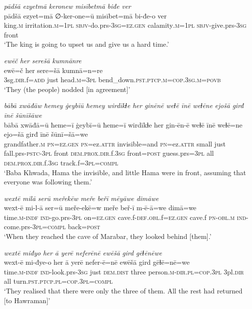 \ea \label{BP.102}
\textit{pādšā ezyetmā keronew misībetmā biđe ver} \\ 
\gll pādšā ezyet=mā ∅-ker-one=ū misībet=mā bi-đe-o ver \\ 
 king\textsc{.m} irritation\textsc{.m}\textsc{=\textsc{1pl}} \textsc{sbjv-}do.prs\textsc{-3sg}\textsc{=ez.gen} calamity\textsc{.m}\textsc{=\textsc{1pl}} \textsc{sbjv-}give.prs\textsc{-3sg} front \\ 
\glt `The king is going to upset us and give us a hard time.'
\z 
 
\ea \label{BP.104}
\textit{ewēč her serešā kumnānre} \\ 
\gll ewē=č her sere=šā kumnā=n=re \\ 
 3sg\textsc{.dir}.f\textsc{=add} just head\textsc{.m}\textsc{=3pl} bend\_down\textsc{.pst}\textsc{.ptcp}\textsc{.m}\textsc{=cop}\textsc{.3sg}\textsc{.m}\textsc{=\textsc{povb}} \\ 
\glt `They (the people) nodded [in agreement]'
\z 
 
\ea \label{BP.105}
\textit{bābā xwāđāw ħemey ġeybīū ħemey wirdīkɫe her ginēnē weɫē īnē weɫēne ejošā girđ īnē šūnīšāwe} \\ 
\gll bābā xwāđā=ū ħeme=ī ġeybī=ū ħeme=ī wirdīkɫe her gin-ēn-ē weɫē īnē weɫē=ne ejo=šā girđ īnē šūnī=šā=we \\ 
 grandfather\textsc{.m} \textsc{pn}\textsc{=ez.gen} \textsc{pn}=ez.\textsc{attr} invisible=and \textsc{pn}=ez.\textsc{attr} small just fall.prs\textsc{-pstc}\textsc{-3pl} front \textsc{dem.prox}\textsc{.dir}.f\textsc{.3sg} front\textsc{=\textsc{post}} guess.prs\textsc{=3pl} all \textsc{dem.prox}\textsc{.dir}.f\textsc{.3sg} track.f\textsc{=3pl}\textsc{=compl} \\ 
\glt `Baba Khwada, Hama the invisible, and little Hama were in front, assuming that everyone was following them.'
\z 
 
\ea \label{BP.106}
\textit{wextē milā serū meřekēw meře beřī mēyāwe dimāwe} \\ 
\gll wext-ē mi-l-ā ser=ū meře-ekē=w meře beř-ī m-ē-ā=we dimā=we \\ 
 time\textsc{.m}\textsc{-indf} \textsc{ind-}go.prs\textsc{-3pl} on\textsc{=ez.gen} cave.f\textsc{-def}\textsc{.obl}.f\textsc{=ez.gen} cave.f \textsc{pn}\textsc{-obl}\textsc{.m} \textsc{ind-}come.prs\textsc{-3pl}\textsc{=compl} back\textsc{=\textsc{post}} \\ 
\glt `When they reached the cave of Marabar, they looked behind [them].'
\z 
 
\ea \label{BP.107}
\textit{wextē miđyo her ā yerē neferēnē ewēšā gird gēɫēnēwe} \\ 
\gll wext-ē mi-đye-o her ā yerē nefer-ē=nē ewēšā gird gēɫē=nē=we \\ 
 time\textsc{.m}\textsc{-indf} \textsc{ind-}look.prs\textsc{-3sg} just \textsc{dem.dist} three person\textsc{.m}\textsc{-dir}\textsc{.pl}\textsc{=cop}\textsc{.3pl} 3pl\textsc{.dir} all turn\textsc{.pst}\textsc{.ptcp}\textsc{.pl}\textsc{=cop}\textsc{.3pl}\textsc{=compl} \\ 
\glt `They realised that there were only the three of them. All the rest had returned [to Hawraman]'
\z 
 
